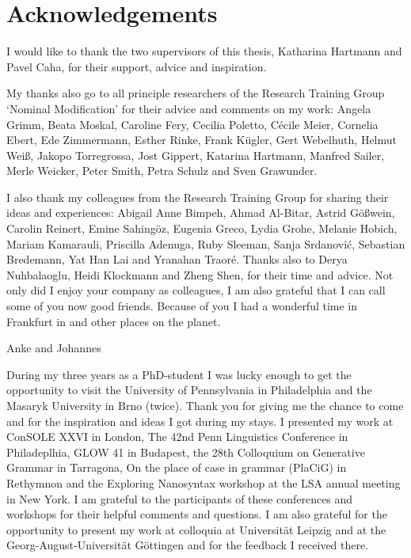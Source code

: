 
\chapter*[Acknowledgements]{Acknowledgements}

I would like to thank the two supervisors of this thesis, Katharina Hartmann and Pavel Caha, for their support, advice and inspiration.

My thanks also go to all principle researchers of the Research Training Group `Nominal Modification' for their advice and comments on my work:
Angela Grimm,
Beata Moskal,
Caroline Fery,
Cecilia Poletto,
Cécile Meier,
Cornelia Ebert,
Ede Zimmermann,
Esther Rinke,
Frank Kügler,
Gert Webelhuth,
Helmut Weiß,
Jakopo Torregrossa,
Jost Gippert,
Katarina Hartmann,
Manfred Sailer,
Merle Weicker,
Peter Smith,
Petra Schulz and
Sven Grawunder.

I also thank my colleagues from the Research Training Group for sharing their ideas and experiences:
Abigail Anne Bimpeh,
Ahmad Al-Bitar,
Astrid Gößwein,
Carolin Reinert,
Emine Sahingöz,
Eugenia Greco,
Lydia Grohe,
Melanie Hobich,
Mariam Kamarauli,
Priscilla Adenuga,
Ruby Sleeman,
Sanja Srdanović,
Sebastian Bredemann,
Yat Han Lai and
Yranahan Traoré.
Thanks also to
Derya Nuhbalaoglu,
Heidi Klockmann and
Zheng Shen,
for their time and advice.
Not only did I enjoy your company as colleagues, I am also grateful that I can call some of you now good friends.
Because of you I had a wonderful time in Frankfurt in and other places on the planet.

Anke and Johannes

During my three years as a PhD-student I was lucky enough to get the opportunity to visit the University of Pennsylvania in Philadelphia and the Masaryk University in Brno (twice). Thank you for giving me the chance to come and for the inspiration and ideas I got during my stays.
I presented my work at
ConSOLE XXVI in London,
The 42nd Penn Linguistics Conference in Philadeplhia,
GLOW 41 in Budapest,
the 28th Colloquium on Generative Grammar in Tarragona,
On the place of case in grammar (PlaCiG) in Rethymnon and
the Exploring Nanosyntax workshop at the LSA annual meeting in New York.
I am grateful to the participants of these conferences and workshops for their helpful comments and questions.
I am also grateful for the opportunity to present my work at colloquia at Universität Leipzig and at the Georg-August-Universität Göttingen and for the feedback I received there.

